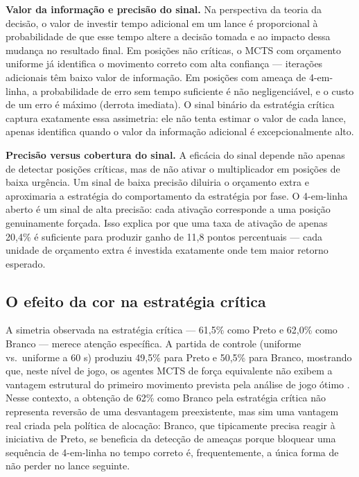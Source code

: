 \documentclass[cic,tc]{iiufrgs}
\begin{document}
\textbf{Valor da informação e precisão do sinal.} Na perspectiva da teoria da decisão, o valor de investir tempo adicional em um lance é proporcional à probabilidade de que esse tempo altere a decisão tomada e ao impacto dessa mudança no resultado final. Em posições não críticas, o MCTS com orçamento uniforme já identifica o movimento correto com alta confiança — iterações adicionais têm baixo valor de informação. Em posições com ameaça de 4-em-linha, a probabilidade de erro sem tempo suficiente é não negligenciável, e o custo de um erro é máximo (derrota imediata). O sinal binário da estratégia crítica captura exatamente essa assimetria: ele não tenta estimar o valor de cada lance, apenas identifica quando o valor da informação adicional é excepcionalmente alto.

\textbf{Precisão versus cobertura do sinal.} A eficácia do sinal depende não apenas de detectar posições críticas, mas de não ativar o multiplicador em posições de baixa urgência. Um sinal de baixa precisão diluiria o orçamento extra e aproximaria a estratégia do comportamento da estratégia por fase. O 4-em-linha aberto é um sinal de alta precisão: cada ativação corresponde a uma posição genuinamente forçada. Isso explica por que uma taxa de ativação de apenas 20,4\% é suficiente para produzir ganho de 11,8 pontos percentuais — cada unidade de orçamento extra é investida exatamente onde tem maior retorno esperado.

\subsection{O efeito da cor na estratégia crítica}
\label{sec:discussion_color}

A simetria observada na estratégia crítica — 61,5\% como Preto e 62,0\% como Branco — merece atenção específica. A partida de controle (uniforme vs.\ uniforme a 60 s) produziu 49,5\% para Preto e 50,5\% para Branco, mostrando que, neste nível de jogo, os agentes MCTS de força equivalente não exibem a vantagem estrutural do primeiro movimento prevista pela análise de jogo ótimo \cite{allis1994searching}. Nesse contexto, a obtenção de 62\% como Branco pela estratégia crítica não representa reversão de uma desvantagem preexistente, mas sim uma vantagem real criada pela política de alocação: Branco, que tipicamente precisa reagir à iniciativa de Preto, se beneficia da detecção de ameaças porque bloquear uma sequência de 4-em-linha no tempo correto é, frequentemente, a única forma de não perder no lance seguinte.
\end{document}

